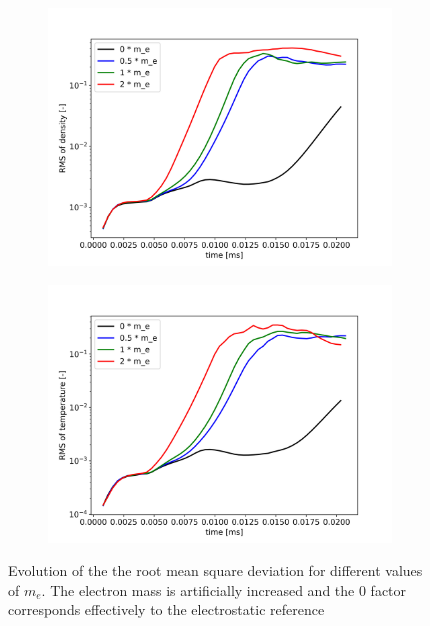 \begin{figure}[H]\centering
	\begin{subfigure}[t]{0.45\textwidth}
		\centering
		\includegraphics[width=1\textwidth]{schemes/RMSn_meScan.jpg}
	\end{subfigure}
	\begin{subfigure}[t]{0.45\textwidth}
		\centering
		\includegraphics[width=1\textwidth]{schemes/RMST_meScan.jpg}
	\end{subfigure}
	\caption{Evolution of the the root mean square deviation for different values of $m_e$. The electron mass is artificially increased and the 0 factor corresponds effectively to the electrostatic reference}
	\label{fig:CIRC_meScan}
\end{figure}


